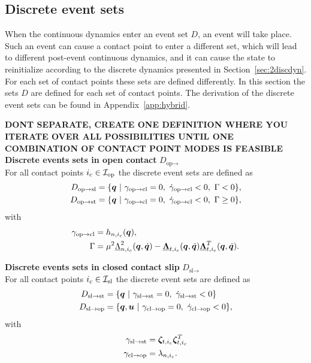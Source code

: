 \documentclass[../DC2017114Bouma.tex]{subfiles}
\begin{document}
\subsection{Discrete event sets}\label{sec:2event}
When the continuous dynamics enter an event set $D$, an event will take place. Such an event can cause a contact point to enter a different set, which will lead to different post-event continuous dynamics, and it can cause the state to reinitialize according to the discrete dynamics presented in Section~\ref{sec:2discdyn}. For each set of contact points these sets are defined differently. In this section the sets $D$ are defined for each set of contact points. The derivation of the discrete event sets can be found in Appendix~\ref{app:hybrid}.

\textbf{DONT SEPARATE, CREATE ONE DEFINITION WHERE YOU ITERATE OVER ALL POSSIBILITIES UNTIL ONE COMBINATION OF CONTACT POINT MODES IS FEASIBLE}\\
\textbf{Discrete events sets in open contact} $D_{\text{op}\rightarrow}$\\
For all contact points $i_c\in\mathcal{I}_{\text{op}}$ the discrete event sets are defined as
\begin{align}
D_{\text{op}\rightarrow\text{sl}} &= \{ \qb\ |\ \gamma_{\text{op}\rightarrow\text{cl}} = 0,\ \dot{\gamma}_{\text{op}\rightarrow\text{cl}} < 0,\ \Gamma < 0 \},\\
D_{\text{op}\rightarrow\text{st}} &= \{ \qb\ |\ \gamma_{\text{op}\rightarrow\text{cl}} = 0,\ \dot{\gamma}_{\text{op}\rightarrow\text{cl}} < 0,\ \Gamma \geq 0 \},
\end{align}
with
\begin{align}
\gamma_{\text{op}\rightarrow\text{cl}} &= h_{n,i_c}({\boldsymbol{q}}),\\
\Gamma &= \mu^2\underline{\Lambda}^2_{n,i_c}({\boldsymbol{q}},\dot{{\boldsymbol{q}}})-\underline{\boldsymbol{\Lambda}}_{t,i_c}({\boldsymbol{q}},\dot{{\boldsymbol{q}}})\underline{\boldsymbol{\Lambda}}^T_{t,i_c}({\boldsymbol{q}},\dot{{\boldsymbol{q}}}).
\end{align}

\textbf{Discrete events sets in closed contact slip} $D_{\text{sl}\rightarrow}$\\
For all contact points $i_c\in\mathcal{I}_{\text{sl}}$ the discrete event sets are defined as
\begin{align}
D_{\text{sl}\rightarrow\text{st}} &= \{ \qb\ |\ \gamma_{\text{sl}\rightarrow\text{st}} = 0,\ \dot{\gamma}_{\text{sl}\rightarrow\text{st}} < 0\}\\
D_{\text{sl}\rightarrow\text{op}} &= \{ \qb,\ub\ |\ \gamma_{\text{cl}\rightarrow\text{op}} = 0,\ \dot{\gamma}_{\text{cl}\rightarrow\text{op}} < 0\},
\end{align}
with 
\begin{align}
\gamma_{\text{sl}\rightarrow\text{st}} &= \boldsymbol{\zeta}_{t,i_c}\boldsymbol{\zeta}_{t,i_c}^T\\
\gamma_{\text{cl}\rightarrow\text{op}} &= \lambda_{n,i_c}.
\end{align}
\end{document}
